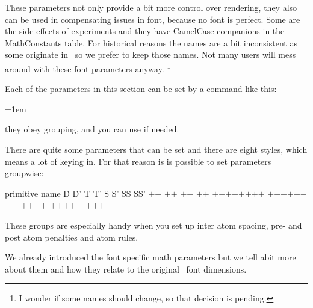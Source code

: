 These parameters not only provide a bit more control over rendering, they also
can be used in compensating issues in font, because no font is perfect. Some are
the side effects of experiments and they have CamelCase companions in the \type
{MathConstants} table. For historical reasons the names are a bit inconsistent as
some originate in \TEX\ so we prefer to keep those names. Not many users will
mess around with these font parameters anyway. \footnote {I wonder if some names
should change, so that decision is pending.}

Each of the parameters in this section can be set by a command like this:

\starttyping
\Umathquad\displaystyle=1em
\stoptyping

they obey grouping, and you can use \type {\the\Umathquad\displaystyle} if
needed.

There are quite some parameters that can be set and there are eight styles, which means a lot
of keying in. For that reason is is possible to set parameters groupwise:

\starttabulate[|l|c|c|c|c|c|c|c|c|]
\FL
\BC primitive name                 \BC D \BC D' \BC T \BC T' \BC S \BC S' \BC SS \BC SS' \NC \NR
\TL
\NC \type {\alldisplaystyles}      \NC$+$\NC$+ $\NC   \NC    \NC   \NC    \NC    \NC     \NC \NR
\NC \type {\alltextstyles}         \NC   \NC    \NC$+$\NC$+ $\NC   \NC    \NC    \NC     \NC \NR
\NC \type {\allscriptstyles}       \NC   \NC    \NC   \NC    \NC$+$\NC$+ $\NC    \NC     \NC \NR
\NC \type {\allscriptscriptstyles} \NC   \NC    \NC   \NC    \NC   \NC    \NC$+ $\NC$+  $\NC \NR
\NC \type {\allmathstyles}         \NC$+$\NC$+ $\NC$+$\NC$+ $\NC$+$\NC$+ $\NC$+ $\NC$+  $\NC \NR
\NC \type {\allmainstyles}         \NC   \NC    \NC   \NC    \NC   \NC    \NC    \NC     \NC \NR
\NC \type {\allsplitstyles}        \NC$+$\NC$+ $\NC$+$\NC$+ $\NC$-$\NC$- $\NC$- $\NC$-  $\NC \NR
\NC \type {\allunsplitstyles}      \NC   \NC    \NC   \NC    \NC$+$\NC$+ $\NC$+ $\NC$+  $\NC \NR
\NC \type {\alluncrampedstyles}    \NC$+$\NC    \NC$+$\NC    \NC$+$\NC    \NC$+ $\NC     \NC \NR
\NC \type {\allcrampedstyles}      \NC   \NC$+ $\NC   \NC$+ $\NC   \NC$+ $\NC    \NC$+  $\NC \NR
\LL
\stoptabulate

These groups are especially handy when you set up inter atom spacing, pre- and
post atom penalties and atom rules.

We already introduced the font specific math parameters but we tell abit more
about them and how they relate to the original \TEX\ font dimensions.

